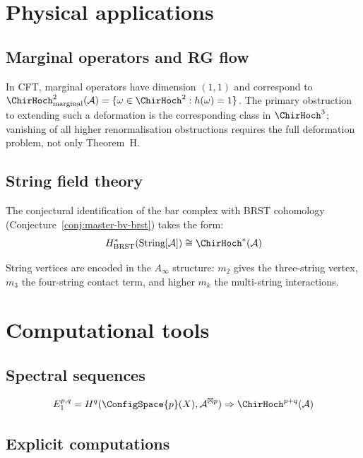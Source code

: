 \section{Physical applications}

\subsection{Marginal operators and RG flow}

In CFT, marginal operators have dimension $(1,1)$ and correspond to
$\ChirHoch^2_{\text{marginal}}(\mathcal{A}) = \{\omega \in \ChirHoch^2 : h(\omega) = 1\}$.
The primary obstruction to extending such a deformation is the
corresponding class in $\ChirHoch^3$; vanishing of all higher
renormalisation obstructions requires the full deformation problem,
not only Theorem~H.

\subsection{String field theory}

The conjectural identification of the bar complex with BRST cohomology (Conjecture~\ref{conj:master-bv-brst}) takes the form:
\[H^*_{\text{BRST}}(\text{String}[\mathcal{A}]) \cong \ChirHoch^*(\mathcal{A})\]

String vertices are encoded in the $A_\infty$ structure: $m_2$ gives the three-string vertex, $m_3$ the four-string contact term, and higher $m_k$ the multi-string interactions.

\section{Computational tools}

\subsection{Spectral sequences}

\begin{theorem}\label{thm:bar-spectral-sequence-hochschild}
\[E_1^{p,q} = H^q(\ConfigSpace{p}(X), \mathcal{A}^{\boxtimes p}) \Rightarrow \ChirHoch^{p+q}(\mathcal{A})\]
\end{theorem}

\subsection{Explicit computations}

